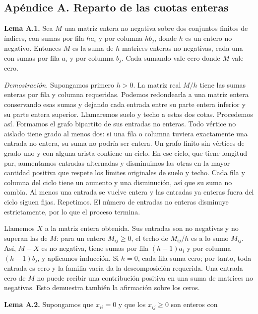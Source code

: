 \documentclass[spanish,11pt,a4paper]{article}
\begin{document}
\subsection{Apéndice A. Reparto de las cuotas enteras}\label{apuxe9ndice-a.-reparto-de-las-cuotas-enteras}

\textbf{Lema A.1.} Sea \(M\) una matriz entera no negativa sobre dos conjuntos finitos de índices, con sumas por fila \(h a_i\) y por columna \(h b_j\), donde \(h\) es un entero no negativo. Entonces \(M\) es la suma de \(h\) matrices enteras no negativas, cada una con sumas por fila \(a_i\) y por columna \(b_j\). Cada sumando vale cero donde \(M\) vale cero.

\emph{Demostración.} Supongamos primero \(h>0\). La matriz real \(M/h\) tiene las sumas enteras por fila y columna requeridas. Podemos redondearla a una matriz entera conservando esas sumas y dejando cada entrada entre su parte entera inferior y su parte entera superior. Llamaremos suelo y techo a estas dos cotas. Procedemos así. Formamos el grafo bipartito de sus entradas no enteras. Todo vértice no aislado tiene grado al menos dos: si una fila o columna tuviera exactamente una entrada no entera, su suma no podría ser entera. Un grafo finito sin vértices de grado uno y con alguna arista contiene un ciclo. En ese ciclo, que tiene longitud par, aumentamos entradas alternadas y disminuimos las otras en la mayor cantidad positiva que respete los límites originales de suelo y techo. Cada fila y columna del ciclo tiene un aumento y una disminución, así que su suma no cambia. Al menos una entrada se vuelve entera y las entradas ya enteras fuera del ciclo siguen fijas. Repetimos. El número de entradas no enteras disminuye estrictamente, por lo que el proceso termina.

Llamemos \(X\) a la matriz entera obtenida. Sus entradas son no negativas y no superan las de \(M\): para un entero \(M_{ij}\ge0\), el techo de \(M_{ij}/h\) es a lo sumo \(M_{ij}\). Así, \(M-X\) es no negativa, tiene sumas por fila \((h-1)a_i\) y por columna \((h-1)b_j\), y aplicamos inducción. Si \(h=0\), cada fila suma cero; por tanto, toda entrada es cero y la familia vacía da la descomposición requerida. Una entrada cero de \(M\) no puede recibir una contribución positiva en una suma de matrices no negativas. Esto demuestra también la afirmación sobre los ceros.

\textbf{Lema A.2.} Supongamos que \(x_{ii}=0\) y que los \(x_{ij}\ge0\) son enteros con
\end{document}
